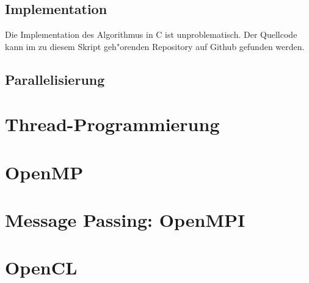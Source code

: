 \subsection{Implementation}
Die Implementation des Algorithmus in C ist unproblematisch. Der Quellcode
kann im zu diesem Skript geh"orenden Repository auf Github gefunden
werden. 

\subsection{Parallelisierung}


\section{Thread-Programmierung}

\section{OpenMP}

\section{Message Passing: OpenMPI}

\section{OpenCL}

